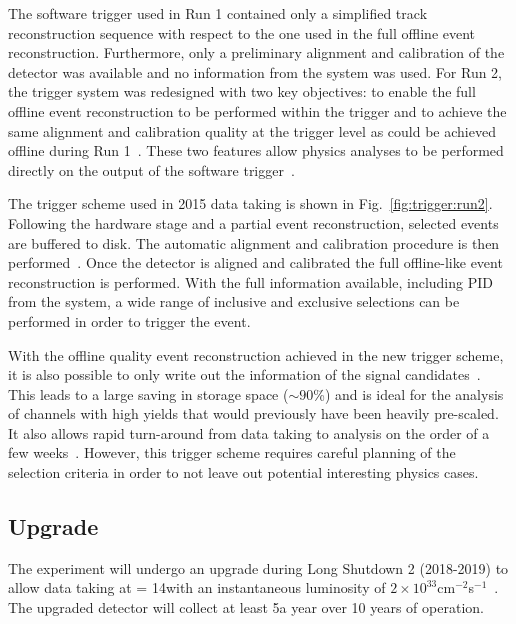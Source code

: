 The software trigger used in Run 1 contained only a simplified track reconstruction sequence with respect to the one used in the full offline event reconstruction. Furthermore, only a preliminary alignment and calibration of the detector was available and no information from the \rich system was used. For Run 2, the trigger system was redesigned with two key objectives: to enable the full offline event reconstruction to be performed within the trigger and to achieve the same alignment and calibration quality at the trigger level as could be achieved offline during Run 1~\cite{hlt-run2}. These two features allow physics analyses to be performed directly on the output of the software trigger~\cite{turbo}.

The trigger scheme used in 2015 data taking is shown in Fig.~\ref{fig:trigger:run2}. Following the hardware stage and a partial event reconstruction, selected events are buffered to disk. The automatic alignment and calibration procedure is then performed~\cite{alignment}. Once the detector is aligned and calibrated the full offline-like event reconstruction is performed. With the full information available, including PID from the \rich system, a wide range of inclusive and exclusive selections can be performed in order to trigger the event.

 With the offline quality event reconstruction achieved in the new trigger scheme, it is also possible to only write out the information of the signal candidates~\cite{turbo}. This leads to a large saving in storage space ($\sim 90$\%) and is ideal for the analysis of channels with high yields that would previously have been heavily pre-scaled. It also allows rapid turn-around from data taking to analysis on the order of a few weeks~\cite{LHCb-PAPER-2015-037,LHCb-PAPER-2015-041}. However, this trigger scheme requires careful planning of the selection criteria in order to not leave out potential interesting physics cases.

\subsection{\lhcb Upgrade}
\label{sec:lhcb:lhcb-upgrade}

The \lhcb experiment will undergo an upgrade during Long Shutdown 2 (2018-2019) to allow data taking at \sqs = 14\tev with an instantaneous luminosity of $2\times10^{33}$cm$^{-2}$s$^{-1}$~\cite{upgrade-loi,LHCb-TDR-012}. The upgraded detector will collect at least 5\invfb a year over 10 years of operation.

